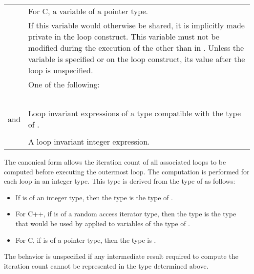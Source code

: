 \begin{supertabular}{ p{0.8in} p{4.5in}}
 & \hspace{1.5em}For C, a variable of a pointer type.\\
 & If this variable would otherwise be shared, it is implicitly made private in the loop 
  construct. This variable must not be modified during the execution of the  
  other than in . Unless the variable is specified 
  or  on the loop construct, its value after the loop is unspecified.\\
 & One of the following:\\
 & \code{<}\\
 & \code{<=}\\
 & \code{>}\\
 & \code{>=}\\
 & \\
 and  & Loop invariant expressions of a type compatible with the type of .\\
 & \\
 & A loop invariant integer expression.\\
\end{supertabular}
\linenumbers
\medskip

\begin{figure}[t!]
\end{figure}
The canonical form allows the iteration count of all associated loops to be computed 
before executing the outermost loop. The computation is performed for each loop in an 
integer type. This type is derived from the type of  as follows:

\begin{itemize}
\item If  is of an integer type, then the type is the type of .

\item For C++, if  is of a random access iterator type, then the type is the type that 
would be used by  applied to variables of the type of .

\item For C, if  is of a pointer type, then the type is .
\end{itemize}

The behavior is unspecified if any intermediate result required to compute the iteration 
count cannot be represented in the type determined above.


